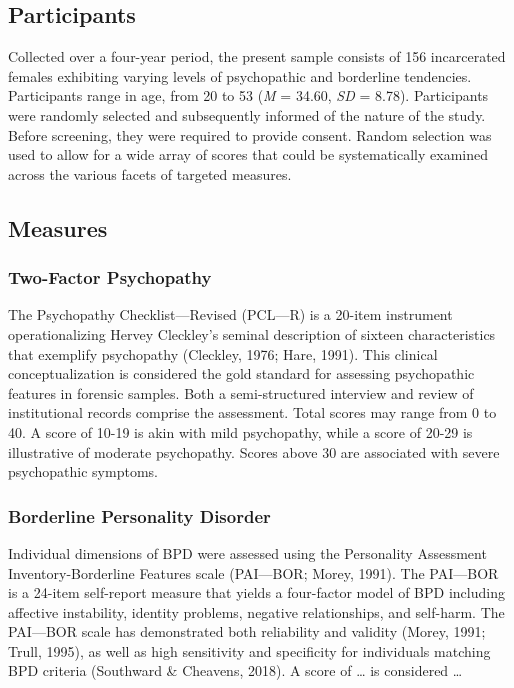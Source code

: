 \documentclass[
  man,floatsintext]{apa7}
\begin{document}
\hypertarget{participants}{%
\subsection{Participants}\label{participants}}

Collected over a four-year period, the present sample consists of 156 incarcerated females exhibiting varying levels of psychopathic and borderline tendencies. Participants range in age, from 20 to 53 (\emph{M} = 34.60, \emph{SD} = 8.78). Participants were randomly selected and subsequently informed of the nature of the study. Before screening, they were required to provide consent. Random selection was used to allow for a wide array of scores that could be systematically examined across the various facets of targeted measures.

\hypertarget{measures}{%
\subsection{Measures}\label{measures}}

\hypertarget{two-factor-psychopathy}{%
\subsubsection{Two-Factor Psychopathy}\label{two-factor-psychopathy}}

The Psychopathy Checklist---Revised (PCL---R) is a 20-item instrument operationalizing Hervey Cleckley's seminal description of sixteen characteristics that exemplify psychopathy (Cleckley, 1976; Hare, 1991). This clinical conceptualization is considered the gold standard for assessing psychopathic features in forensic samples. Both a semi-structured interview and review of institutional records comprise the assessment. Total scores may range from 0 to 40. A score of 10-19 is akin with mild psychopathy, while a score of 20-29 is illustrative of moderate psychopathy. Scores above 30 are associated with severe psychopathic symptoms.

\hypertarget{borderline-personality-disorder}{%
\subsubsection{Borderline Personality Disorder}\label{borderline-personality-disorder}}

Individual dimensions of BPD were assessed using the Personality Assessment Inventory-Borderline Features scale (PAI---BOR; Morey, 1991). The PAI---BOR is a 24-item self-report measure that yields a four-factor model of BPD including affective instability, identity problems, negative relationships, and self-harm. The PAI---BOR scale has demonstrated both reliability and validity (Morey, 1991; Trull, 1995), as well as high sensitivity and specificity for individuals matching BPD criteria (Southward \& Cheavens, 2018). A score of \ldots{} is considered \ldots{}
\end{document}
